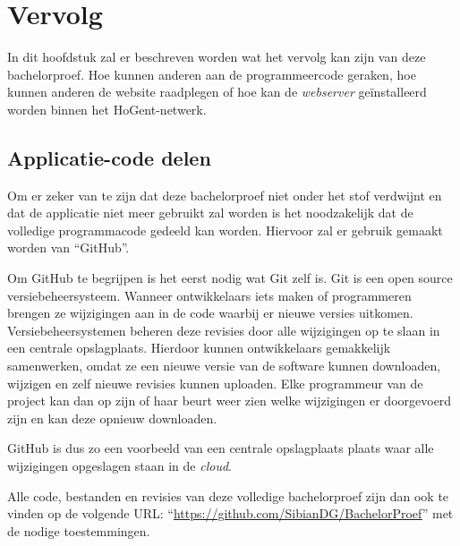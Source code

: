 \chapter{Vervolg}
\label{ch:vervolg}

In dit hoofdstuk zal er beschreven worden wat het vervolg kan zijn van deze bachelorproef. Hoe kunnen anderen aan de programmeercode geraken, hoe kunnen anderen de website raadplegen of hoe kan de \textit{webserver} geïnstalleerd worden binnen het HoGent-netwerk.

\section{Applicatie-code delen}
Om er zeker van te zijn dat deze bachelorproef niet onder het stof verdwijnt en dat de applicatie niet meer gebruikt zal worden is het noodzakelijk dat de volledige programmacode gedeeld kan worden. Hiervoor zal er gebruik gemaakt worden van ``GitHub''.

Om GitHub te begrijpen is het eerst nodig wat Git zelf is. Git is een open source versiebeheersysteem. Wanneer ontwikkelaars iets maken of programmeren brengen ze wijzigingen aan in de code waarbij er nieuwe versies uitkomen. Versiebeheersystemen beheren deze revisies door alle wijzigingen op te slaan in een centrale opslagplaats. Hierdoor kunnen ontwikkelaars gemakkelijk samenwerken, omdat ze een nieuwe versie van de software kunnen downloaden, wijzigen en zelf nieuwe revisies kunnen uploaden. Elke programmeur van de project kan dan op zijn of haar beurt weer zien welke wijzigingen er doorgevoerd zijn en kan deze opnieuw downloaden.~\autocite{Brown2019}

GitHub is dus zo een voorbeeld van een centrale opslagplaats plaats waar alle wijzigingen opgeslagen staan in de \textit{cloud}.

Alle code, bestanden en revisies van deze volledige bachelorproef zijn dan ook te vinden op de volgende URL: ``\url{https://github.com/SibianDG/BachelorProef}'' met de nodige toestemmingen.


